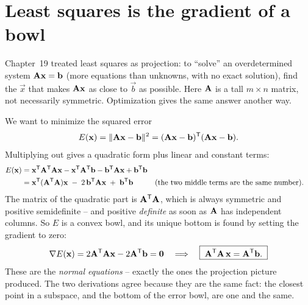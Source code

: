 \section{Least squares is the gradient of a bowl}
\label{ch36:least-squares}

Chapter~19 treated least squares as projection: to ``solve'' an overdetermined system
$\mathbf{A}\mathbf{x}=\mathbf{b}$ (more equations than unknowns, with no exact solution), find
the $\vec{x}$ that makes $\mathbf{A}\mathbf{x}$ as close to $\vec{b}$ as possible. Here
$\mathbf{A}$ is a tall $m\times n$ matrix, not necessarily symmetric. Optimization gives
the same answer another way.

We want to minimize the squared error
\[
  E(\mathbf{x}) = \lVert\mathbf{A}\mathbf{x}-\mathbf{b}\rVert^2 = (\mathbf{A}\mathbf{x}-\mathbf{b})^{\mathsf{T}}(\mathbf{A}\mathbf{x}-\mathbf{b}).
\]
Multiplying out gives a quadratic form plus linear and constant terms:
\begin{align*}
  E(\mathbf{x}) &= \mathbf{x}^{\mathsf{T}}\mathbf{A}^{\mathsf{T}}\mathbf{A}\mathbf{x} - \mathbf{x}^{\mathsf{T}}\mathbf{A}^{\mathsf{T}}\mathbf{b}
                - \mathbf{b}^{\mathsf{T}}\mathbf{A}\mathbf{x} + \mathbf{b}^{\mathsf{T}}\mathbf{b}\\
             &= \mathbf{x}^{\mathsf{T}}(\mathbf{A}^{\mathsf{T}}\mathbf{A})\mathbf{x} \;-\; 2\,\mathbf{b}^{\mathsf{T}}\mathbf{A}\mathbf{x} \;+\; \mathbf{b}^{\mathsf{T}}\mathbf{b}
             && \text{(the two middle terms are the same number).}
\end{align*}
The matrix of the quadratic part is $\mathbf{A}^{\mathsf{T}}\mathbf{A}$, which is always symmetric and
positive semidefinite -- and positive \emph{definite} as soon as $\mathbf{A}$ has
independent columns. So $E$ is a convex bowl, and its unique bottom is found by
setting the gradient to zero:
\[
  \nabla E(\mathbf{x}) = 2\mathbf{A}^{\mathsf{T}}\mathbf{A}\mathbf{x} - 2\mathbf{A}^{\mathsf{T}}\mathbf{b} = \mathbf{0}
  \quad\Longrightarrow\quad \boxed{\;\mathbf{A}^{\mathsf{T}}\mathbf{A}\,\mathbf{x} = \mathbf{A}^{\mathsf{T}}\mathbf{b}.\;}
\]
These are the \emph{normal equations} -- exactly the ones the projection picture
produced. The two derivations agree because they are the same fact: the closest point
in a subspace, and the bottom of the error bowl, are one and the same.

